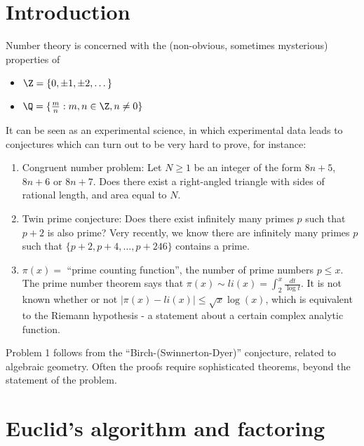 \documentclass{article}
\begin{document}
\maketitle
\section{Introduction}
Number theory is concerned with the (non-obvious, sometimes mysterious) properties of
\begin{itemize}
    \item $\Z = \{0, \pm 1, \pm 2, \dots\}$
    \item $\Q = \{\frac{m}{n} : m, n \in \Z, n \ne 0\}$
\end{itemize}
It can be seen as an experimental science, in which experimental data leads to conjectures which can turn out to be very hard to prove, for instance:
\begin{enumerate}
    \item Congruent number problem: Let $N \geq 1$ be an integer of the form $8n + 5$, $8n+6$ or $8n + 7$. Does there exist a right-angled triangle with sides of rational length, and area equal to $N$.
    \item Twin prime conjecture: Does there exist infinitely many primes $p$ such that $p+2$ is also prime? Very recently, we know there are infinitely many primes $p$ such that $\{p+2, p+4, \dots, p+246\}$ contains a prime.
    \item $\pi(x) = $ ``prime counting function'', the number of prime numbers $p \leq x$.
        The prime number theorem says that $\pi(x) \sim li(x) = \int_2^x \frac{dt}{\log t}$. It is not known whether or not $|\pi(x) - li(x)| \leq \sqrt{x} \log(x)$, which is equivalent to the Riemann hypothesis - a statement about a certain complex analytic function.
\end{enumerate}
Problem 1 follows from the ``Birch-(Swinnerton-Dyer)'' conjecture, related to algebraic geometry.
Often the proofs require sophisticated theorems, beyond the statement of the problem.
\section{Euclid's algorithm and factoring}
\end{document}

